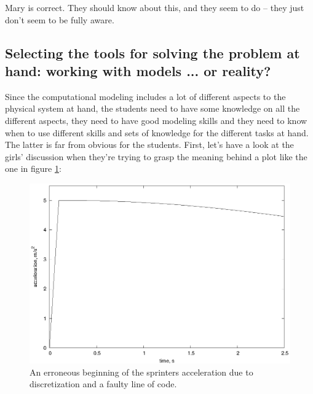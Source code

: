 \documentclass[aps,prb,floatfix,twocolumn,twoside,english]{revtex4-1}
\begin{document}
Mary is correct. They should know about this, and they seem to do -- they just don't seem to be fully aware.



\subsection{Selecting the tools for solving the problem at hand: working with models ... or reality?}

Since the computational modeling includes a lot of different aspects to the physical system at hand, the students need to have some knowledge on all the different aspects, they need to have good modeling skills and they need to know when to use different skills and sets of knowledge for the different tasks at hand. The latter is far from obvious for the students. First, let's have a look at the girls' discussion when they're trying to grasp the meaning behind a plot like the one in figure \ref{fig:discrete_acceleration}:

\begin{figure}[htbp]
\begin{center}
 \includegraphics[scale=0.67]{figures/acceleration_error}
 \caption{An erroneous beginning of the sprinters acceleration due to discretization and a faulty line of code.}
 \label{fig:discrete_acceleration}
\end{center}
\end{figure}
\end{document}
